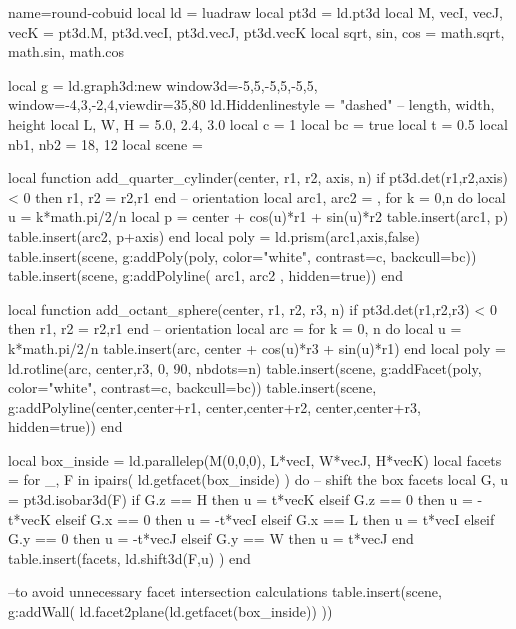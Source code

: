 \documentclass{standalone}
\begin{document}
\begin{luadraw}{name=round-cobuid}
local ld = luadraw
local pt3d = ld.pt3d
local M, vecI, vecJ, vecK = pt3d.M, pt3d.vecI, pt3d.vecJ, pt3d.vecK
local sqrt, sin, cos = math.sqrt, math.sin, math.cos

local g = ld.graph3d:new{
  window3d={-5,5,-5,5,-5,5},
  window={-4,3,-2,4},viewdir={35,80}
}
ld.Hiddenlinestyle = "dashed"
-- length, width, height
local L, W, H = 5.0, 2.4, 3.0
local c = 1
local bc = true
local t = 0.5
local nb1, nb2 = 18, 12
local scene = {}

local function add_quarter_cylinder(center, r1, r2, axis, n)
  if pt3d.det(r1,r2,axis) < 0 then r1, r2 = r2,r1 end -- orientation
  local arc1, arc2 = {}, {}
  for k = 0,n do
    local u = k*math.pi/2/n
    local p = center + cos(u)*r1 + sin(u)*r2
    table.insert(arc1, p)
    table.insert(arc2, p+axis)
  end
  local poly = ld.prism(arc1,axis,false)
  table.insert(scene, g:addPoly(poly, {color="white", contrast=c, backcull=bc}))
  table.insert(scene, g:addPolyline( {arc1, arc2 }, {hidden=true}))
end

local function add_octant_sphere(center, r1, r2, r3, n)
    if pt3d.det(r1,r2,r3) < 0 then r1, r2 = r2,r1 end -- orientation
    local arc = {}
    for k = 0, n do
        local u = k*math.pi/2/n
        table.insert(arc, center + cos(u)*r3 + sin(u)*r1)
    end
    local poly = ld.rotline(arc, {center,r3}, 0, 90, {nbdots=n})
    table.insert(scene, g:addFacet(poly, {color="white", contrast=c, backcull=bc}))
    table.insert(scene, g:addPolyline({{center,center+r1}, {center,center+r2}, 
        {center,center+r3}}, {hidden=true}))
end

local box_inside = ld.parallelep(M(0,0,0), L*vecI, W*vecJ, H*vecK)
local facets = {}
for _, F in ipairs( ld.getfacet(box_inside) ) do -- shift the box facets
    local G, u = pt3d.isobar3d(F)
    if G.z == H then u = t*vecK
    elseif G.z == 0 then u = -t*vecK
    elseif G.x == 0 then u = -t*vecI
    elseif G.x == L then u = t*vecI
    elseif G.y == 0 then u = -t*vecJ
    elseif G.y == W then u = t*vecJ
    end
    table.insert(facets, ld.shift3d(F,u) )
end

--to avoid unnecessary facet intersection calculations
table.insert(scene, g:addWall( ld.facet2plane(ld.getfacet(box_inside)) ))


\end{luadraw}
\end{document}
